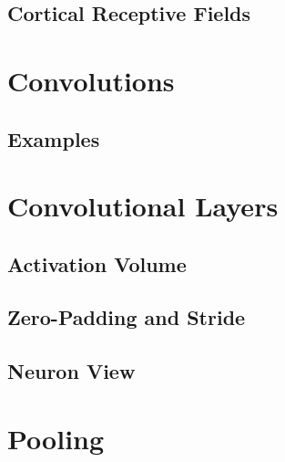 		\subsection{Cortical Receptive Fields} %

	\section{Convolutions} %

		\subsection{Examples} %

	\section{Convolutional Layers} %

		\subsection{Activation Volume} %

		\subsection{Zero-Padding and Stride} %

		\subsection{Neuron View} %

	\section{Pooling} %

